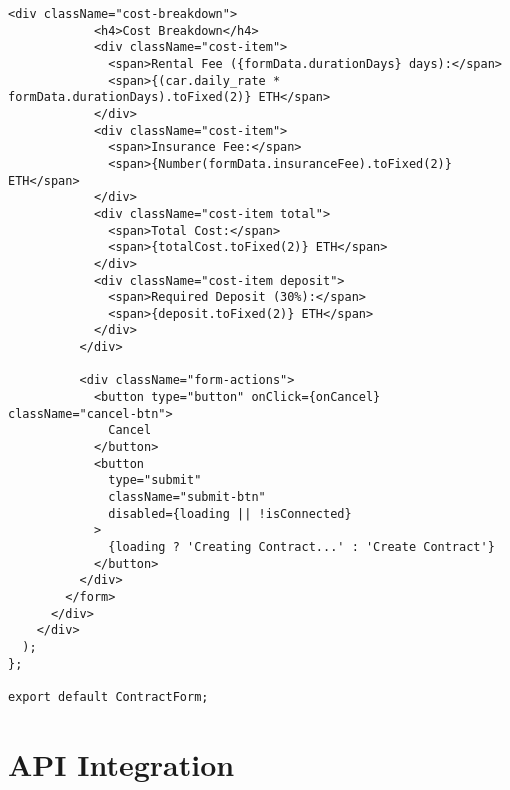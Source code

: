 \documentclass[12pt,a4paper]{article}
\begin{document}
\begin{lstlisting}[caption=ContractForm Component]
          <div className="cost-breakdown">
            <h4>Cost Breakdown</h4>
            <div className="cost-item">
              <span>Rental Fee ({formData.durationDays} days):</span>
              <span>{(car.daily_rate * formData.durationDays).toFixed(2)} ETH</span>
            </div>
            <div className="cost-item">
              <span>Insurance Fee:</span>
              <span>{Number(formData.insuranceFee).toFixed(2)} ETH</span>
            </div>
            <div className="cost-item total">
              <span>Total Cost:</span>
              <span>{totalCost.toFixed(2)} ETH</span>
            </div>
            <div className="cost-item deposit">
              <span>Required Deposit (30%):</span>
              <span>{deposit.toFixed(2)} ETH</span>
            </div>
          </div>

          <div className="form-actions">
            <button type="button" onClick={onCancel} className="cancel-btn">
              Cancel
            </button>
            <button 
              type="submit" 
              className="submit-btn"
              disabled={loading || !isConnected}
            >
              {loading ? 'Creating Contract...' : 'Create Contract'}
            </button>
          </div>
        </form>
      </div>
    </div>
  );
};

export default ContractForm;
\end{lstlisting}

\section{API Integration}
\end{document}
